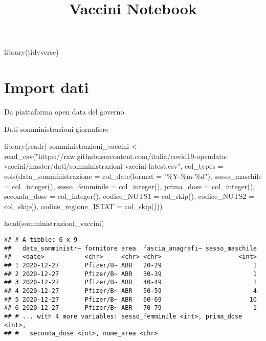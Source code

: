 \documentclass[
]{article}
\title{Vaccini Notebook}
\author{}
\date{\vspace{-2.5em}}
\newenvironment{Shaded}{\begin{snugshade}}{\end{snugshade}}
\newcommand{\AttributeTok}[1]{\textcolor[rgb]{0.77,0.63,0.00}{#1}}
\newcommand{\FunctionTok}[1]{\textcolor[rgb]{0.00,0.00,0.00}{#1}}
\newcommand{\NormalTok}[1]{#1}
\newcommand{\OtherTok}[1]{\textcolor[rgb]{0.56,0.35,0.01}{#1}}
\newcommand{\StringTok}[1]{\textcolor[rgb]{0.31,0.60,0.02}{#1}}
\begin{document}
\maketitle

\begin{Shaded}
\begin{Highlighting}[]
\FunctionTok{library}\NormalTok{(tidyverse)}
\end{Highlighting}
\end{Shaded}

\hypertarget{import-dati}{%
\section{Import dati}\label{import-dati}}

Da piattaforma open data del governo.

Dati somministrazioni giornaliere

\begin{Shaded}
\begin{Highlighting}[]
\FunctionTok{library}\NormalTok{(readr)}
\NormalTok{somministrazioni\_vaccini }\OtherTok{\textless{}{-}} \FunctionTok{read\_csv}\NormalTok{(}\StringTok{"https://raw.githubusercontent.com/italia/covid19{-}opendata{-}vaccini/master/dati/somministrazioni{-}vaccini{-}latest.csv"}\NormalTok{, }
    \AttributeTok{col\_types =} \FunctionTok{cols}\NormalTok{(}\AttributeTok{data\_somministrazione =} \FunctionTok{col\_date}\NormalTok{(}\AttributeTok{format =} \StringTok{"\%Y{-}\%m{-}\%d"}\NormalTok{), }
        \AttributeTok{sesso\_maschile =} \FunctionTok{col\_integer}\NormalTok{(), }
        \AttributeTok{sesso\_femminile =} \FunctionTok{col\_integer}\NormalTok{(), }
        \AttributeTok{prima\_dose =} \FunctionTok{col\_integer}\NormalTok{(), }\AttributeTok{seconda\_dose =} \FunctionTok{col\_integer}\NormalTok{(), }
        \AttributeTok{codice\_NUTS1 =} \FunctionTok{col\_skip}\NormalTok{(), }\AttributeTok{codice\_NUTS2 =} \FunctionTok{col\_skip}\NormalTok{(), }
        \AttributeTok{codice\_regione\_ISTAT =} \FunctionTok{col\_skip}\NormalTok{()))}

\FunctionTok{head}\NormalTok{(somministrazioni\_vaccini)}
\end{Highlighting}
\end{Shaded}

\begin{verbatim}
## # A tibble: 6 x 9
##   data_somministr~ fornitore area  fascia_anagrafi~ sesso_maschile
##   <date>           <chr>     <chr> <chr>                     <int>
## 1 2020-12-27       Pfizer/B~ ABR   20-29                         1
## 2 2020-12-27       Pfizer/B~ ABR   30-39                         1
## 3 2020-12-27       Pfizer/B~ ABR   40-49                         1
## 4 2020-12-27       Pfizer/B~ ABR   50-59                         4
## 5 2020-12-27       Pfizer/B~ ABR   60-69                        10
## 6 2020-12-27       Pfizer/B~ ABR   70-79                         1
## # ... with 4 more variables: sesso_femminile <int>, prima_dose <int>,
## #   seconda_dose <int>, nome_area <chr>
\end{verbatim}
\end{document}
